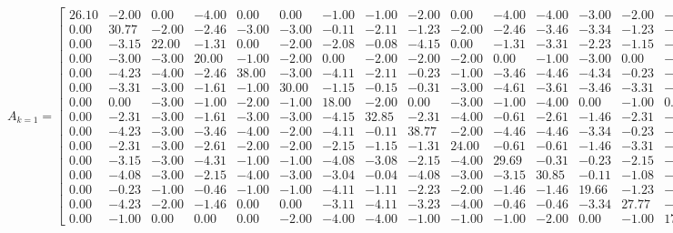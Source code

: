 \documentclass[a4paper, 12pt]{article}
\begin{document}
\[
A_{k = 1} = 
\left[{
	\begin{array}{rrrrrrrrrrrrrrr}
	26.10 & -2.00 & 0.00 & -4.00 & 0.00 & 0.00 & -1.00 & -1.00 & -2.00 & 0.00 & -4.00 & -4.00 & -3.00 & -2.00 & -3.00 \\
	0.00 & 30.77 & -2.00 & -2.46 & -3.00 & -3.00 & -0.11 & -2.11 & -1.23 & -2.00 & -2.46 & -3.46 & -3.34 & -1.23 & -4.34 \\
	0.00 & -3.15 & 22.00 & -1.31 & 0.00 & -2.00 & -2.08 & -0.08 & -4.15 & 0.00 & -1.31 & -3.31 & -2.23 & -1.15 & -1.23 \\
	0.00 & -3.00 & -3.00 & 20.00 & -1.00 & -2.00 & 0.00 & -2.00 & -2.00 & -2.00 & 0.00 & -1.00 & -3.00 & 0.00 & -1.00 \\
	0.00 & -4.23 & -4.00 & -2.46 & 38.00 & -3.00 & -4.11 & -2.11 & -0.23 & -1.00 & -3.46 & -4.46 & -4.34 & -0.23 & -4.34 \\
	0.00 & -3.31 & -3.00 & -1.61 & -1.00 & 30.00 & -1.15 & -0.15 & -0.31 & -3.00 & -4.61 & -3.61 & -3.46 & -3.31 & -1.46 \\
	0.00 &  0.00 & -3.00 & -1.00 & -2.00 & -1.00 & 18.00 & -2.00 &  0.00 & -3.00 & -1.00 & -4.00 &  0.00 & -1.00 &  0.00 \\
	0.00 & -2.31 & -3.00 & -1.61 & -3.00 & -3.00 & -4.15 & 32.85 & -2.31 & -4.00 & -0.61 & -2.61 & -1.46 & -2.31 & -2.46 \\
	0.00 & -4.23 & -3.00 & -3.46 & -4.00 & -2.00 & -4.11 & -0.11 & 38.77 & -2.00 & -4.46 & -4.46 & -3.34 & -0.23 & -3.34 \\
	0.00 & -2.31 & -3.00 & -2.61 & -2.00 & -2.00 & -2.15 & -1.15 & -1.31 & 24.00 & -0.61 & -0.61 & -1.46 & -3.31 & -1.46 \\
	0.00 & -3.15 & -3.00 & -4.31 & -1.00 & -1.00 & -4.08 & -3.08 & -2.15 & -4.00 & 29.69 & -0.31 & -0.23 & -2.15 & -1.23 \\
	0.00 & -4.08 & -3.00 & -2.15 & -4.00 & -3.00 & -3.04 & -0.04 & -4.08 & -3.00 & -3.15 & 30.85 & -0.11 & -1.08 & -0.11 \\
	0.00 & -0.23 & -1.00 & -0.46 & -1.00 & -1.00 & -4.11 & -1.11 & -2.23 & -2.00 & -1.46 & -1.46 & 19.66 & -1.23 & -2.34 \\
	0.00 & -4.23 & -2.00 & -1.46 &  0.00 &  0.00 & -3.11 & -4.11 & -3.23 & -4.00 & -0.46 & -0.46 & -3.34 & 27.77 & -1.34 \\
	0.00 & -1.00 &  0.00 &  0.00 &  0.00 & -2.00 & -4.00 & -4.00 & -1.00 & -1.00 & -1.00 & -2.00 &  0.00 & -1.00 & 17.00
	\end{array} 
}\right]\]
\end{document}

